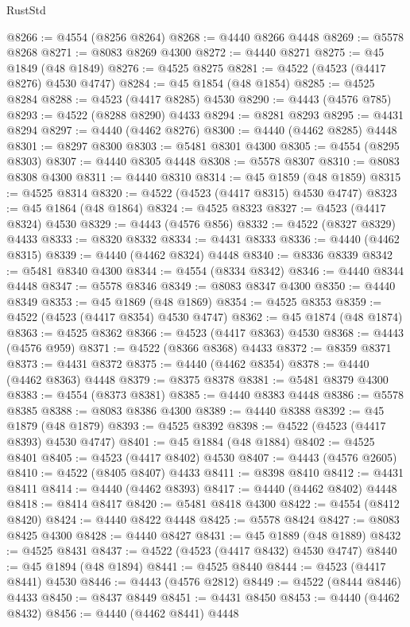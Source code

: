 \begin{lexlean}{RustStd}
\begin{coremodule}
{\begin{coremodule}
{{{{{{{{{{{{{{{{{{{{{{{{{{{{{{{{{{{{{{{{{{{{{{{{{{{{{{{{{{{{@8266 := @4554 (@8256 @8264)
@8268 := @4440 @8266 @4448
@8269 := @5578 @8268
@8271 := @8083 @8269 @4300
@8272 := @4440 @8271
@8275 := @45 @1849 (@48 @1849)
@8276 := @4525 @8275
@8281 := @4522 (@4523 (@4417 @8276) @4530 @4747)
@8284 := @45 @1854 (@48 @1854)
@8285 := @4525 @8284
@8288 := @4523 (@4417 @8285) @4530
@8290 := @4443 (@4576 @785)
@8293 := @4522 (@8288 @8290) @4433
@8294 := @8281 @8293
@8295 := @4431 @8294
@8297 := @4440 (@4462 @8276)
@8300 := @4440 (@4462 @8285) @4448
@8301 := @8297 @8300
@8303 := @5481 @8301 @4300
@8305 := @4554 (@8295 @8303)
@8307 := @4440 @8305 @4448
@8308 := @5578 @8307
@8310 := @8083 @8308 @4300
@8311 := @4440 @8310
@8314 := @45 @1859 (@48 @1859)
@8315 := @4525 @8314
@8320 := @4522 (@4523 (@4417 @8315) @4530 @4747)
@8323 := @45 @1864 (@48 @1864)
@8324 := @4525 @8323
@8327 := @4523 (@4417 @8324) @4530
@8329 := @4443 (@4576 @856)
@8332 := @4522 (@8327 @8329) @4433
@8333 := @8320 @8332
@8334 := @4431 @8333
@8336 := @4440 (@4462 @8315)
@8339 := @4440 (@4462 @8324) @4448
@8340 := @8336 @8339
@8342 := @5481 @8340 @4300
@8344 := @4554 (@8334 @8342)
@8346 := @4440 @8344 @4448
@8347 := @5578 @8346
@8349 := @8083 @8347 @4300
@8350 := @4440 @8349
@8353 := @45 @1869 (@48 @1869)
@8354 := @4525 @8353
@8359 := @4522 (@4523 (@4417 @8354) @4530 @4747)
@8362 := @45 @1874 (@48 @1874)
@8363 := @4525 @8362
@8366 := @4523 (@4417 @8363) @4530
@8368 := @4443 (@4576 @959)
@8371 := @4522 (@8366 @8368) @4433
@8372 := @8359 @8371
@8373 := @4431 @8372
@8375 := @4440 (@4462 @8354)
@8378 := @4440 (@4462 @8363) @4448
@8379 := @8375 @8378
@8381 := @5481 @8379 @4300
@8383 := @4554 (@8373 @8381)
@8385 := @4440 @8383 @4448
@8386 := @5578 @8385
@8388 := @8083 @8386 @4300
@8389 := @4440 @8388
@8392 := @45 @1879 (@48 @1879)
@8393 := @4525 @8392
@8398 := @4522 (@4523 (@4417 @8393) @4530 @4747)
@8401 := @45 @1884 (@48 @1884)
@8402 := @4525 @8401
@8405 := @4523 (@4417 @8402) @4530
@8407 := @4443 (@4576 @2605)
@8410 := @4522 (@8405 @8407) @4433
@8411 := @8398 @8410
@8412 := @4431 @8411
@8414 := @4440 (@4462 @8393)
@8417 := @4440 (@4462 @8402) @4448
@8418 := @8414 @8417
@8420 := @5481 @8418 @4300
@8422 := @4554 (@8412 @8420)
@8424 := @4440 @8422 @4448
@8425 := @5578 @8424
@8427 := @8083 @8425 @4300
@8428 := @4440 @8427
@8431 := @45 @1889 (@48 @1889)
@8432 := @4525 @8431
@8437 := @4522 (@4523 (@4417 @8432) @4530 @4747)
@8440 := @45 @1894 (@48 @1894)
@8441 := @4525 @8440
@8444 := @4523 (@4417 @8441) @4530
@8446 := @4443 (@4576 @2812)
@8449 := @4522 (@8444 @8446) @4433
@8450 := @8437 @8449
@8451 := @4431 @8450
@8453 := @4440 (@4462 @8432)
@8456 := @4440 (@4462 @8441) @4448
}}}}}}}}}}}}}}}}}}}}}}}}}}}}}}}}}}}}}}}}}}}}}}}}}}}}}}}}}}}}
\end{coremodule}}
\end{coremodule}
\end{lexlean}

